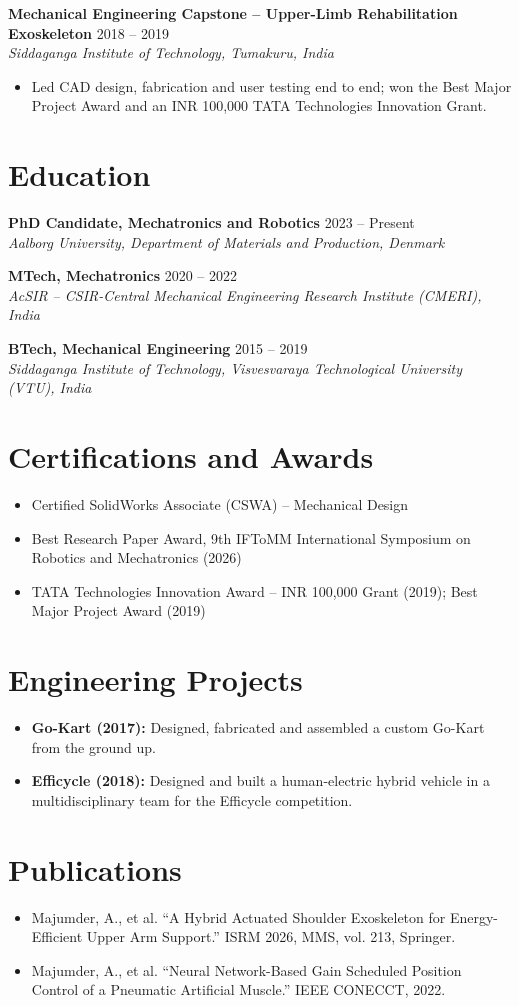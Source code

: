 \documentclass[10pt,a4paper]{article}
\newcommand{\role}[3]{\textbf{#1} \textbar{} #2\\\textit{#3}\par}
\begin{document}
\role{Mechanical Engineering Capstone -- Upper-Limb Rehabilitation Exoskeleton}{2018 -- 2019}{Siddaganga Institute of Technology, Tumakuru, India}
\begin{itemize}
\item Led CAD design, fabrication and user testing end to end; won the Best Major Project Award and an INR 100,000 TATA Technologies Innovation Grant.
\end{itemize}

\section{Education}
\role{PhD Candidate, Mechatronics and Robotics}{2023 -- Present}{Aalborg University, Department of Materials and Production, Denmark}
\role{MTech, Mechatronics}{2020 -- 2022}{AcSIR -- CSIR-Central Mechanical Engineering Research Institute (CMERI), India}
\role{BTech, Mechanical Engineering}{2015 -- 2019}{Siddaganga Institute of Technology, Visvesvaraya Technological University (VTU), India}

\section{Certifications and Awards}
\begin{itemize}
\item Certified SolidWorks Associate (CSWA) -- Mechanical Design
\item Best Research Paper Award, 9th IFToMM International Symposium on Robotics and Mechatronics (2026)
\item TATA Technologies Innovation Award -- INR 100,000 Grant (2019); Best Major Project Award (2019)
\end{itemize}

\section{Engineering Projects}
\begin{itemize}
\item \textbf{Go-Kart (2017):} Designed, fabricated and assembled a custom Go-Kart from the ground up.
\item \textbf{Efficycle (2018):} Designed and built a human-electric hybrid vehicle in a multidisciplinary team for the Efficycle competition.
\end{itemize}

\section{Publications}
\begin{itemize}
\item Majumder, A., et al. ``A Hybrid Actuated Shoulder Exoskeleton for Energy-Efficient Upper Arm Support.'' ISRM 2026, MMS, vol. 213, Springer.
\item Majumder, A., et al. ``Neural Network-Based Gain Scheduled Position Control of a Pneumatic Artificial Muscle.'' IEEE CONECCT, 2022.
\end{itemize}
\end{document}
